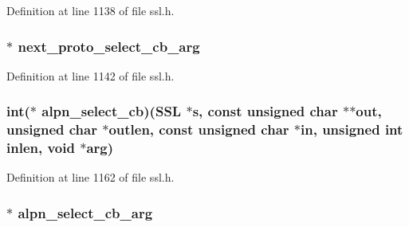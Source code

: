 Definition at line 1138 of file ssl.\+h.

\subsubsection[{\texorpdfstring{next\+\_\+proto\+\_\+select\+\_\+cb\+\_\+arg}{next_proto_select_cb_arg}}]{ $\ast$ next\+\_\+proto\+\_\+select\+\_\+cb\+\_\+arg}\hypertarget{structssl__ctx__st_a9a763a6b990ff57b3b1168d7241995f4}{}\label{structssl__ctx__st_a9a763a6b990ff57b3b1168d7241995f4}


Definition at line 1142 of file ssl.\+h.

\subsubsection[{\texorpdfstring{alpn\+\_\+select\+\_\+cb}{alpn_select_cb}}]{\setlength{\rightskip}{0pt plus 5cm}int($\ast$ alpn\+\_\+select\+\_\+cb)({\bf S\+SL} $\ast$s, const unsigned char $\ast$$\ast$out, unsigned char $\ast$outlen, const unsigned char $\ast$in, unsigned int inlen, {\bf void} $\ast$arg)}\hypertarget{structssl__ctx__st_a65abf4d526978169dd0891e9e22f1aa1}{}\label{structssl__ctx__st_a65abf4d526978169dd0891e9e22f1aa1}


Definition at line 1162 of file ssl.\+h.

\subsubsection[{\texorpdfstring{alpn\+\_\+select\+\_\+cb\+\_\+arg}{alpn_select_cb_arg}}]{ $\ast$ alpn\+\_\+select\+\_\+cb\+\_\+arg}\hypertarget{structssl__ctx__st_a67098b2e6f1c355022d6a94238d51ba2}{}\label{structssl__ctx__st_a67098b2e6f1c355022d6a94238d51ba2}


